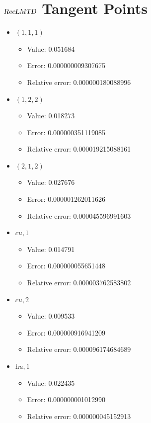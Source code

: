 \documentclass{article}%
\begin{document}
\section{$\textsl{RecLMTD}$ Tangent Points}%
\thispagestyle{plain}%
\begin{itemize}%
	\item $(1, 1, 1)$%
	\begin{itemize}%
		\item Value: 0.051684%
		\item Error: 0.000000009307675%
		\item Relative error: 0.000000180088996%
	\end{itemize}%
	\item $(1, 2, 2)$%
	\begin{itemize}%
		\item Value: 0.018273%
		\item Error: 0.000000351119085%
		\item Relative error: 0.000019215088161%
	\end{itemize}%
	\item $(2, 1, 2)$%
	\begin{itemize}%
		\item Value: 0.027676%
		\item Error: 0.000001262011626%
		\item Relative error: 0.000045596991603%
	\end{itemize}%
	\item $\textit{cu},1$%
	\begin{itemize}%
		\item Value: 0.014791%
		\item Error: 0.000000055651448%
		\item Relative error: 0.000003762583802%
	\end{itemize}%
	\item $\textit{cu},2$%
	\begin{itemize}%
		\item Value: 0.009533%
		\item Error: 0.000000916941209%
		\item Relative error: 0.000096174684689%
	\end{itemize}%
	\item $\textit{hu},1$%
	\begin{itemize}%
		\item Value: 0.022435%
		\item Error: 0.000000001012990%
		\item Relative error: 0.000000045152913%
	\end{itemize}%
\end{itemize}%
\end{document}
